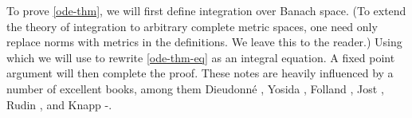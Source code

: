 To prove \autoref{ode-thm}, we will first define
integration over Banach space. (To extend the theory of integration
to arbitrary complete metric spaces, one need only replace norms with metrics in
the definitions. We leave this to the reader.) Using which we will use to
rewrite \eqref{ode-thm-eq} as an integral equation. A fixed point
argument will then complete the proof. These notes are heavily influenced by a
number of excellent books, among them Dieudonn{\'e}
\cite{Dieudonne_1969_Foundations-of-}, Yosida \cite{Yosida:1980fk},
Folland \cite{Folland_1999_Real-analysis}, Jost
\cite{Jost-1998-Postmodern-analysis}, Rudin \cite{Rudin:1976uq}, and Knapp
\cite{Knapp:2005rm}-\cite{Knapp:2005yg}.
%
%
%
%
%
%
%
%
%
%
%
%
%
%
